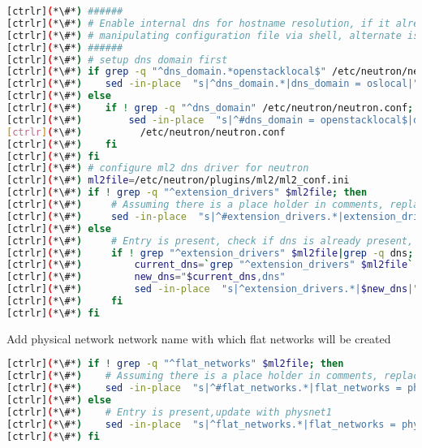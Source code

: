 
\begin{lstlisting}[language=bash,keywords={}]
[ctrlr](*\#*) ######
[ctrlr](*\#*) # Enable internal dns for hostname resolution, if it already not set
[ctrlr](*\#*) # manipulating configuration file via shell, alternate is to use openstack-config 
[ctrlr](*\#*) ######
[ctrlr](*\#*) # setup dns domain first
[ctrlr](*\#*) if grep -q "^dns_domain.*openstacklocal$" /etc/neutron/neutron.conf; then
[ctrlr](*\#*)    sed -in-place  "s|^dns_domain.*|dns_domain = oslocal|" /etc/neutron/neutron.conf
[ctrlr](*\#*) else
[ctrlr](*\#*)    if ! grep -q "^dns_domain" /etc/neutron/neutron.conf; then
[ctrlr](*\#*)        sed -in-place  "s|^#dns_domain = openstacklocal$|dns_domain = oslocal|" \
[ctrlr](*\#*)          /etc/neutron/neutron.conf
[ctrlr](*\#*)    fi
[ctrlr](*\#*) fi
[ctrlr](*\#*) # configure ml2 dns driver for neutron
[ctrlr](*\#*) ml2file=/etc/neutron/plugins/ml2/ml2_conf.ini
[ctrlr](*\#*) if ! grep -q "^extension_drivers" $ml2file; then
[ctrlr](*\#*)     # Assuming there is a place holder in comments, replace that string
[ctrlr](*\#*)     sed -in-place  "s|^#extension_drivers.*|extension_drivers = port_security,dns|" $ml2file
[ctrlr](*\#*) else
[ctrlr](*\#*)     # Entry is present, check if dns is already present, if not then enable
[ctrlr](*\#*)     if ! grep "^extension_drivers" $ml2file|grep -q dns; then
[ctrlr](*\#*)         current_dns=`grep "^extension_drivers" $ml2file`
[ctrlr](*\#*)         new_dns="$current_dns,dns"
[ctrlr](*\#*)         sed -in-place  "s|^extension_drivers.*|$new_dns|" $ml2file
[ctrlr](*\#*)     fi
[ctrlr](*\#*) fi
\end{lstlisting} 

	Add physical network network name with which flat networks will be created


\begin{lstlisting}[language=bash,keywords={}]
[ctrlr](*\#*) if ! grep -q "^flat_networks" $ml2file; then
[ctrlr](*\#*)    # Assuming there is a place holder in comments, replace that string
[ctrlr](*\#*)    sed -in-place  "s|^#flat_networks.*|flat_networks = physnet1|" $ml2file
[ctrlr](*\#*) else
[ctrlr](*\#*)    # Entry is present,update with physnet1 
[ctrlr](*\#*)    sed -in-place  "s|^flat_networks.*|flat_networks = physnet1|" $ml2file
[ctrlr](*\#*) fi
\end{lstlisting} 

